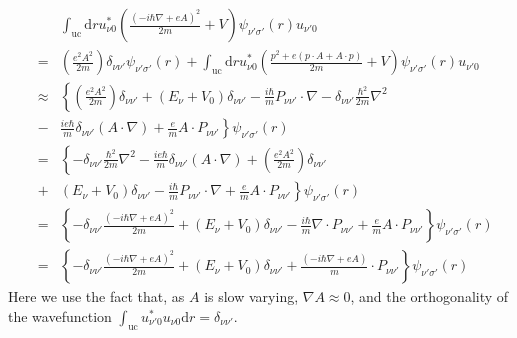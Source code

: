 \documentclass{article}
\begin{document}
\begin{eqnarray*}  &  & \int_{\text{uc}} \text{d} r u^{\ast}_{\nu 0} \left( \frac{(- i \hbar  \nabla + e A)^2}{2 m} + V \right) \psi_{\nu' \sigma'} (r) u_{\nu' 0}\\  & = & \left( \frac{e^2 A^2}{2 m} \right) \delta_{\nu \nu'} \psi_{\nu'  \sigma'} (r) + \int_{\text{uc}} \text{d} r u^{\ast}_{\nu 0} \left( \frac{p^2  + e (p \cdot A + A \cdot p)}{2 m} + V \right) \psi_{\nu' \sigma'} (r)  u_{\nu' 0}\\  & \approx & \left\{ \left( \frac{e^2 A^2}{2 m} \right) \delta_{\nu \nu'} +  (E_{\nu} + V_0) \delta_{\nu \nu'} - \frac{i \hbar}{m} P_{\nu \nu'} \cdot  \nabla - \delta_{\nu \nu'} \frac{\hbar^2}{2 m} \nabla^2 \right.\\  & - & \left. \frac{i e \hbar}{m} \delta_{\nu \nu'} (A \cdot \nabla) +  \frac{e}{m} A \cdot P_{\nu \nu'} \right\} \psi_{\nu' \sigma'} (r)\\  & = & \left\{ - \delta_{\nu \nu'} \frac{\hbar^2}{2 m} \nabla^2 - \frac{i e  \hbar}{m} \delta_{\nu \nu'} (A \cdot \nabla) + \left( \frac{e^2 A^2}{2 m}  \right) \delta_{\nu \nu'} \right.\\  & + & \left. (E_{\nu} + V_0) \delta_{\nu \nu'} - \frac{i \hbar}{m} P_{\nu  \nu'} \cdot \nabla + \frac{e}{m} A \cdot P_{\nu \nu'} \right\} \psi_{\nu'  \sigma'} (r)\\  & = & \left\{ - \delta_{\nu \nu'} \frac{(- i \hbar \nabla + e A)^2}{2 m} +  (E_{\nu} + V_0) \delta_{\nu \nu'} - \frac{i \hbar}{m} \nabla \cdot P_{\nu  \nu'} + \frac{e}{m} A \cdot P_{\nu \nu'} \right\} \psi_{\nu' \sigma'} (r)\\  & = & \left\{ - \delta_{\nu \nu'} \frac{(- i \hbar \nabla + e A)^2}{2 m} +  (E_{\nu} + V_0) \delta_{\nu \nu'} + \frac{(- i \hbar \nabla + e A)}{m} \cdot  P_{\nu \nu'} \right\} \psi_{\nu' \sigma'} (r)\end{eqnarray*}
Here we use the fact that, as $A$ is slow varying, $\nabla A \approx 0$, and the orthogonality of the wavefunction $\int_{\text{uc}}u^*_{\nu'0}u_{\nu 0}\text{d}r=\delta_{\nu \nu'}$.
\end{document}
